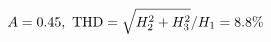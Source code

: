 \documentclass[preview]{standalone}
\begin{document}
\begin{align*}
\special{dvisvgm:raw <g id='unique000'>}A=0.45,\ \text{THD}=\sqrt{H_2^2+H_3^2}/H_1=8.8\%\special{dvisvgm:raw </g>}
\end{align*}
\end{document}
